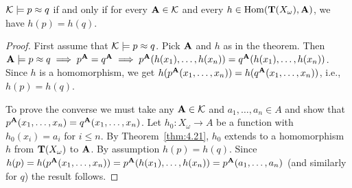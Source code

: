\begin{lemma}
  \label{lem:4.37} 
  $\mathcal{K} \models p \approx q$ 
  if  and  only  if  for  every  $\mathbf{A} \in \mathcal{K}$  and  every  
  $h\in \operatorname{Hom}(\mathbf{T}(X_\omega),\mathbf{A})$,  we  have  $h(p)  =  h(q)$.
\end{lemma} 
\begin{proof} First  assume  that  $\mathcal{K} \models p\approx  q$.  
  Pick  $\mathbf{A}$ and $h$ as  in  the  theorem.  Then
  $\mathbf{A} \models p\approx q \implies p^{\mathbf{A}} = q^{\mathbf{A}} \implies 
  p^{\mathbf{A}}(h(x_1), \dots, h(x_n)) = q^{\mathbf{A}}(h(x_1), \dots, h(x_n))$.
  Since  $h$  is  a  homomorphism,  we  get  
  $h(p^{\mathbf{A}}(x_1, \dots, x_n)) = h(q^{\mathbf{A}}(x_1, \dots, x_n))$, i.e., $h(p) = h(q)$.

  To  prove  the  converse  we  must  take  any  $\mathbf{A} \in \mathcal{K}$  and  
  $a_1, \dots, a_n \in A$ and show that $p^{\mathbf{A}}(x_1, \dots, x_n) = q^{\mathbf{A}}(x_1, \dots, x_n)$.
  Let $h_0 \colon X_\omega \to A$ be a function with $h_0(x_i) = a_i$ for $i\leq n$.
  By  Theorem~\ref{thm:4.21},  $h_0$ extends  to  a homomorphism  $h$ from $\mathbf{T}(X_\omega)$
  to $\mathbf{A}$.  By  assumption  $h(p)  =  h(q)$.  Since 
  $h(p)  =  h(p^{\mathbf{A}}(x_1, \dots, x_n)) = 
  p^{\mathbf{A}}(h(x_1), \dots, h(x_n)) =  p^{\mathbf{A}}(a_1,\dots, a_n)$ 
  (and  similarly  for  $q$)  the  result  follows. 
\end{proof}



